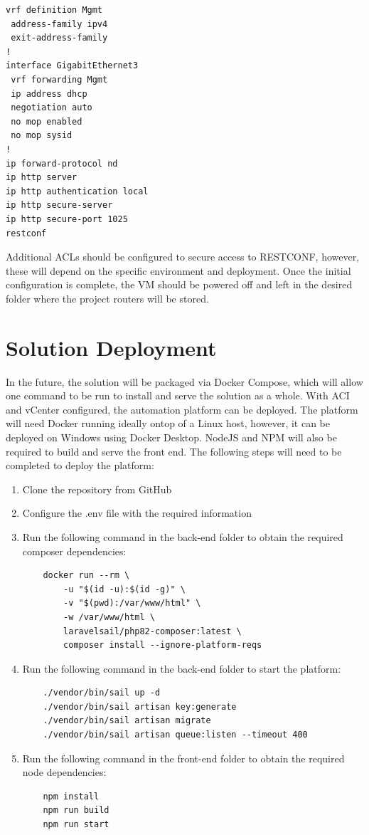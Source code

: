 \begin{verbatim}
vrf definition Mgmt
 address-family ipv4
 exit-address-family
!
interface GigabitEthernet3
 vrf forwarding Mgmt
 ip address dhcp
 negotiation auto
 no mop enabled
 no mop sysid
!
ip forward-protocol nd
ip http server
ip http authentication local
ip http secure-server
ip http secure-port 1025
restconf
\end{verbatim}

Additional ACLs should be configured to secure access to RESTCONF, however, these will depend on the specific environment and deployment. Once the initial configuration is complete, the VM should be powered off and left in the desired folder where the project routers will be stored.


\section*{Solution Deployment}
In the future, the solution will be packaged via Docker Compose, which will allow one command to be run to install and serve the solution as a whole.
With ACI and vCenter configured, the automation platform can be deployed. The platform will need Docker running ideally ontop of a Linux host, however, it can be deployed on Windows using Docker Desktop. NodeJS and NPM will also be required to build and serve the front end. The following steps will need to be completed to deploy the platform:

\begin{enumerate}
    \item Clone the repository from GitHub
    \item Configure the .env file with the required information
    \item Run the following command in the back-end folder to obtain the required composer dependencies:
          \begin{verbatim}
    docker run --rm \
        -u "$(id -u):$(id -g)" \
        -v "$(pwd):/var/www/html" \
        -w /var/www/html \
        laravelsail/php82-composer:latest \
        composer install --ignore-platform-reqs
          \end{verbatim}
    \item Run the following command in the back-end folder to start the platform:
          \begin{verbatim}
    ./vendor/bin/sail up -d
    ./vendor/bin/sail artisan key:generate
    ./vendor/bin/sail artisan migrate
    ./vendor/bin/sail artisan queue:listen --timeout 400
            \end{verbatim}
    \item Run the following command in the front-end folder to obtain the required node dependencies:
    \begin{verbatim}
    npm install
    npm run build
    npm run start
    \end{verbatim}
\end{enumerate}

